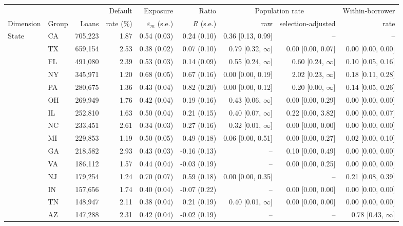 \begin{tabular}{llrrrrrrr}
\toprule
 & & & Default & Exposure & Ratio & \multicolumn{2}{c}{Population rate} & Within-borrower \\
\cmidrule(lr){7-8}
Dimension & Group & Loans & rate (\%) & $\varepsilon_m$ (s.e.) & $R$ (s.e.) & raw & selection-adjusted & rate \\
\midrule
State & CA & 705,223 & 1.87 & 0.54 (0.03) & 0.24 (0.10) & 0.36 [0.13, 0.99] & -- & -- \\
 & TX & 659,154 & 2.53 & 0.38 (0.02) & 0.07 (0.10) & 0.79 [0.32, $\infty$] & 0.00 [0.00, 0.07] & 0.00 [0.00, 0.00] \\
 & FL & 491,080 & 2.39 & 0.53 (0.03) & 0.14 (0.09) & 0.55 [0.24, $\infty$] & 0.60 [0.24, $\infty$] & 0.10 [0.05, 0.16] \\
 & NY & 345,971 & 1.20 & 0.68 (0.05) & 0.67 (0.16) & 0.00 [0.00, 0.19] & 2.02 [0.23, $\infty$] & 0.18 [0.11, 0.28] \\
 & PA & 280,675 & 1.36 & 0.43 (0.04) & 0.82 (0.20) & 0.00 [0.00, 0.12] & 0.20 [0.00, $\infty$] & 0.14 [0.05, 0.26] \\
 & OH & 269,949 & 1.76 & 0.42 (0.04) & 0.19 (0.16) & 0.43 [0.06, $\infty$] & 0.00 [0.00, 0.29] & 0.00 [0.00, 0.00] \\
 & IL & 252,810 & 1.63 & 0.50 (0.04) & 0.21 (0.15) & 0.40 [0.07, $\infty$] & 0.22 [0.00, 3.82] & 0.00 [0.00, 0.07] \\
 & NC & 233,451 & 2.61 & 0.34 (0.03) & 0.27 (0.16) & 0.32 [0.01, $\infty$] & 0.00 [0.00, 0.00] & 0.00 [0.00, 0.00] \\
 & MI & 229,853 & 1.19 & 0.50 (0.05) & 0.49 (0.18) & 0.06 [0.00, 0.51] & 0.00 [0.00, 0.27] & 0.02 [0.00, 0.10] \\
 & GA & 218,582 & 2.93 & 0.43 (0.03) & -0.16 (0.13) & -- & 0.10 [0.00, 0.49] & 0.00 [0.00, 0.00] \\
 & VA & 186,112 & 1.57 & 0.44 (0.04) & -0.03 (0.19) & -- & 0.00 [0.00, 0.25] & 0.00 [0.00, 0.00] \\
 & NJ & 179,254 & 1.24 & 0.70 (0.07) & 0.59 (0.18) & 0.00 [0.00, 0.35] & -- & 0.21 [0.08, 0.39] \\
 & IN & 157,656 & 1.74 & 0.40 (0.04) & -0.07 (0.22) & -- & 0.00 [0.00, 0.00] & 0.00 [0.00, 0.00] \\
 & TN & 148,947 & 2.11 & 0.38 (0.04) & 0.21 (0.19) & 0.40 [0.01, $\infty$] & 0.00 [0.00, 0.00] & 0.00 [0.00, 0.00] \\
 & AZ & 147,288 & 2.31 & 0.42 (0.04) & -0.02 (0.19) & -- & -- & 0.78 [0.43, $\infty$] \\

\end{tabular}
